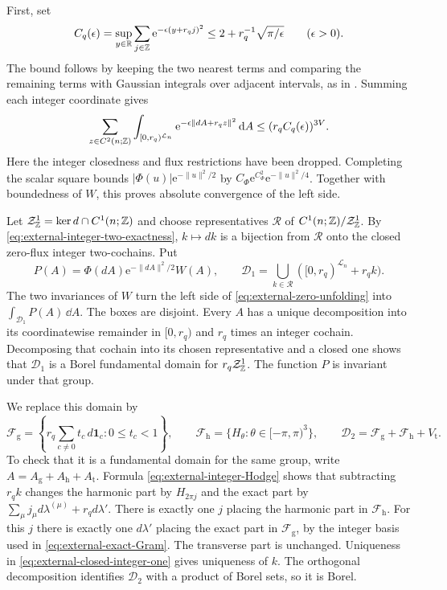 First, set
\[
 C_q(\epsilon)=\sup_{y\in\mathbb R}\sum_{j\in\mathbb Z}
                  \mathrm e^{-\epsilon(y+r_qj)^2}
       \le2+r_q^{-1}\sqrt{\pi/\epsilon}\qquad(\epsilon>0).
\]
The bound follows by keeping the two nearest terms and comparing
the remaining terms with Gaussian integrals over adjacent intervals,
as in \cite[(5)]{ChamberLattice}. Summing each integer coordinate gives
\[
 \sum_{z\in C^2(n;\mathbb Z)}\int_{[0,r_q)^{\mathcal L_n}}
              \mathrm e^{-\epsilon\|dA+r_qz\|^2}\,\mathrm d A
                     \le(r_qC_q(\epsilon))^{3V}.
\]
Here the integer closedness and flux restrictions have
been dropped. Completing the scalar square bounds
$|\Phi(u)|\mathrm e^{-\|u\|^2/2}$ by
$C_\Phi \mathrm e^{C_\Phi^2}\mathrm e^{-\|u\|^2/4}$.
Together with boundedness of $W$, this proves absolute
convergence of the left side.

Let $\mathcal Z^1_{\mathbb Z}=\ker d\cap C^1(n;\mathbb Z)$ and
choose representatives $\mathcal R$ of
$C^1(n;\mathbb Z)/\mathcal Z^1_{\mathbb Z}$. By
\eqref{eq:external-integer-two-exactness}, $k\mapsto dk$
is a bijection from $\mathcal R$ onto the closed
zero-flux integer two-cochains. Put
\[
 P(A)=\Phi(dA)\mathrm e^{-\|dA\|^2/2}W(A),\qquad
 \mathcal D_1=\bigcup_{k\in\mathcal R}
                     ([0,r_q)^{\mathcal L_n}+r_qk).
\]
The two invariances of $W$ turn the left side of
\eqref{eq:external-zero-unfolding} into
$\int_{\mathcal D_1}P(A)\,\dd A$.
The boxes are disjoint. Every $A$ has a unique decomposition
into its coordinatewise remainder in $[0,r_q)$ and
$r_q$ times an integer cochain. Decomposing that cochain
into its chosen representative and a closed one shows
that $\mathcal D_1$ is a Borel fundamental domain for
$r_q\mathcal Z^1_{\mathbb Z}$. The function $P$ is invariant
under that group.

We replace this domain by
\[
 \mathcal F_{\mathrm g}
 =\left\{r_q\sum_{c\ne0}t_c\,d\mathbf1_c:0\le t_c<1\right\},
 \qquad
 \mathcal F_{\mathrm h}=\{H_\theta:\theta\in[-\pi,\pi)^3\},
 \qquad
 \mathcal D_2=\mathcal F_{\mathrm g}+\mathcal F_{\mathrm h}
                                      +V_{\mathrm t}.
\]
To check that it is a fundamental domain for the same
group, write $A=A_{\mathrm g}+A_{\mathrm h}+A_{\mathrm t}$.
Formula \eqref{eq:external-integer-Hodge} shows that
subtracting $r_qk$ changes the harmonic part by
$H_{2\pi j}$ and the exact part by
$\sum_\mu j_\mu d\lambda^{(\mu)}+r_qd\lambda'$.
There is exactly one $j$ placing the harmonic part
in $\mathcal F_{\mathrm h}$. For this $j$ there is
exactly one $d\lambda'$ placing the exact part
in $\mathcal F_{\mathrm g}$, by the integer basis
used in \eqref{eq:external-exact-Gram}. The transverse
part is unchanged. Uniqueness in
\eqref{eq:external-closed-integer-one} gives uniqueness
of $k$. The orthogonal decomposition identifies
$\mathcal D_2$ with a product of Borel sets, so it
is Borel.

